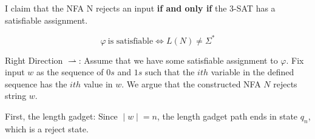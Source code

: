 \documentclass[12pt]{article}
\begin{document}
\begin{solution}
    
    I claim that the NFA N rejects an input \textbf{if and only if} the \textsc{3-SAT} has a satisfiable assignment.
    
    \[
    \varphi\ \text{is\ satisfiable} \Leftrightarrow L(N) \ne \Sigma^*
    \]
    
    Right Direction $\rightharpoonup$:
    Assume that we have some satisfiable assignment to $\varphi$. Fix input $w$ as the sequence of $0s$ and $1s$ such that the $ith$ variable in the defined sequence has the $ith$ value in $w$. We argue that the constructed NFA $N$ rejects string $w$.
    
    First, the length gadget: Since $∣w∣=n$, the length gadget path ends in state $q_n$, which is a reject state.
    

\end{solution}
\end{document}
